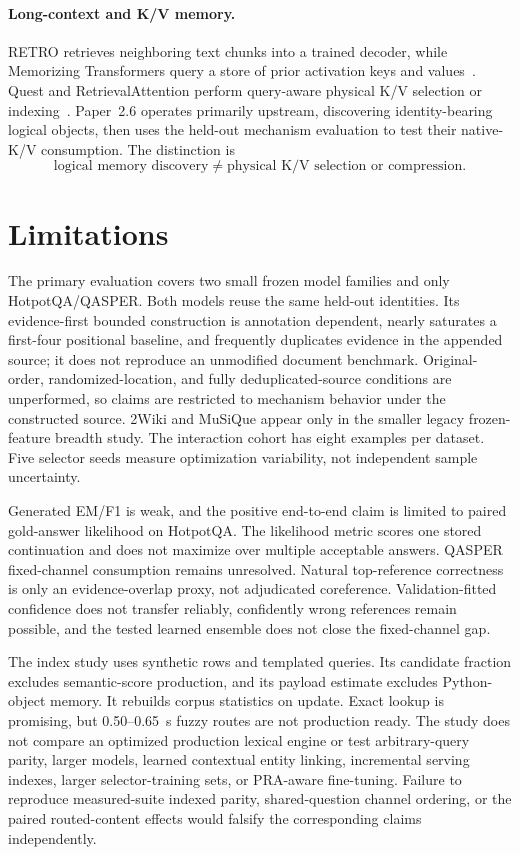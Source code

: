\documentclass[11pt]{article}
\begin{document}
\paragraph{Long-context and K/V memory.}
RETRO retrieves neighboring text chunks into a trained decoder, while Memorizing Transformers query a store of prior activation keys and values~\cite{borgeaud2022retro,wu2022memorizing}. Quest and RetrievalAttention perform query-aware physical K/V selection or indexing~\cite{tang2024quest,liu2025retrievalattention}. Paper~2.6 operates primarily upstream, discovering identity-bearing logical objects, then uses the held-out mechanism evaluation to test their native-K/V consumption. The distinction is
\[
\boxed{\text{logical memory discovery}}\neq
\boxed{\text{physical K/V selection or compression}}.
\]

\section{Limitations}
The primary evaluation covers two small frozen model families and only HotpotQA/QASPER. Both models reuse the same held-out identities. Its evidence-first bounded construction is annotation dependent, nearly saturates a first-four positional baseline, and frequently duplicates evidence in the appended source; it does not reproduce an unmodified document benchmark. Original-order, randomized-location, and fully deduplicated-source conditions are unperformed, so claims are restricted to mechanism behavior under the constructed source. 2Wiki and MuSiQue appear only in the smaller legacy frozen-feature breadth study. The interaction cohort has eight examples per dataset. Five selector seeds measure optimization variability, not independent sample uncertainty.

Generated EM/F1 is weak, and the positive end-to-end claim is limited to paired gold-answer likelihood on HotpotQA. The likelihood metric scores one stored continuation and does not maximize over multiple acceptable answers. QASPER fixed-channel consumption remains unresolved. Natural top-reference correctness is only an evidence-overlap proxy, not adjudicated coreference. Validation-fitted confidence does not transfer reliably, confidently wrong references remain possible, and the tested learned ensemble does not close the fixed-channel gap.

The index study uses synthetic rows and templated queries. Its candidate fraction excludes semantic-score production, and its payload estimate excludes Python-object memory. It rebuilds corpus statistics on update. Exact lookup is promising, but 0.50--0.65~s fuzzy routes are not production ready. The study does not compare an optimized production lexical engine or test arbitrary-query parity, larger models, learned contextual entity linking, incremental serving indexes, larger selector-training sets, or PRA-aware fine-tuning. Failure to reproduce measured-suite indexed parity, shared-question channel ordering, or the paired routed-content effects would falsify the corresponding claims independently.
\end{document}
